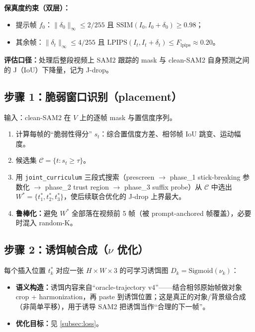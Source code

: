 \documentclass[11pt,a4paper]{ctexart}
\begin{document}
\textbf{保真度约束（双层）：}
\begin{itemize}[leftmargin=2em]
    \item 提示帧 $f_0$：$\|\delta_0\|_\infty \leq 2/255$ 且 $\mathrm{SSIM}(I_0, I_0+\delta_0) \geq 0.98$；
    \item 其余帧：$\|\delta_t\|_\infty \leq 4/255$ 且 $\mathrm{LPIPS}(I_t, I_t+\delta_t) \leq F_{\mathrm{lpips}} \approx 0.20$。
\end{itemize}

\textbf{评估口径：}处理后整段视频上 SAM2 跟踪的 mask 与 clean-SAM2 自身预测之间的 J（IoU）下降量，记为 J-drop。

\subsection{步骤 1：脆弱窗口识别（placement）}

输入：clean-SAM2 在 $V$ 上的逐帧 mask 与置信度序列。

\begin{enumerate}[leftmargin=2em]
    \item 计算每帧的``脆弱性得分'' $s_t$：综合置信度方差、相邻帧 IoU 跳变、运动幅度。
    \item 候选集 $\mathcal{C} = \{t : s_t \geq \tau\}$。
    \item 用 \texttt{joint\_curriculum} 三段式搜索（prescreen $\to$ phase\_1 stick-breaking 参数化 $\to$ phase\_2 trust region $\to$ phase\_3 suffix probe）从 $\mathcal{C}$ 中选出 $W^*=\{t^*_1, t^*_2, t^*_3\}$，使后续联合优化的 J-drop 上界最大。
    \item \textbf{鲁棒化：}避免 $W^*$ 全部落在视频前 5 帧（被 prompt-anchored 帧覆盖），必要时混入 random-K。
\end{enumerate}

\subsection{步骤 2：诱饵帧合成（$\nu$ 优化）}

每个插入位置 $t^*_k$ 对应一张 $H \times W \times 3$ 的可学习诱饵图 $D_k = \mathrm{Sigmoid}(\nu_k)$：

\begin{itemize}[leftmargin=2em]
    \item \textbf{语义构造：}诱饵内容来自``oracle-trajectory v4''——结合相邻原始帧做对象 crop + harmonization，再 paste 到诱饵位置；这是真正的对象/背景级合成（非简单平移），用于诱导 SAM2 把诱饵当作``合理的下一帧''。
    \item \textbf{优化目标：}见 \ref{subsec:loss}。
\end{itemize}
\end{document}
